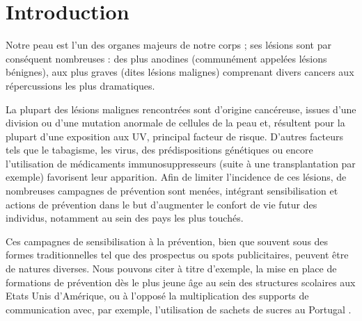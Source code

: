 \chapter*{Introduction}
\mtcaddchapter 
\label{chap:introduction}
Notre peau est l’un des organes majeurs de notre corps ; ses lésions sont par conséquent nombreuses :  des plus anodines (communément appelées lésions bénignes), aux plus graves (dites lésions malignes) comprenant divers cancers aux répercussions les plus dramatiques.\par
La plupart des lésions malignes rencontrées sont d’origine cancéreuse, issues d’une division ou d’une mutation anormale de cellules de la peau et, résultent pour la plupart d’une exposition aux UV, principal facteur de risque.  D’autres facteurs tels que le tabagisme, les virus, des prédispositions génétiques ou encore l’utilisation de médicaments immunosuppresseurs (suite à une transplantation par exemple) favorisent leur apparition. Afin de limiter l’incidence de ces lésions, de nombreuses campagnes de prévention sont menées, intégrant sensibilisation et actions de prévention dans le but d’augmenter le confort de vie futur des individus, notamment au sein des pays les plus touchés.\par
Ces campagnes de sensibilisation à la prévention, bien que souvent sous des formes traditionnelles tel que des prospectus ou spots publicitaires, peuvent être de natures diverses. Nous pouvons citer à titre d’exemple, la mise en place de formations de prévention dès le plus jeune âge au sein des structures scolaires aux Etats Unis d’Amérique, ou à l’opposé la multiplication des supports de communication avec, par exemple, l’utilisation de sachets de sucres au Portugal \cite{Correia2017,Guy2016}.\par 
